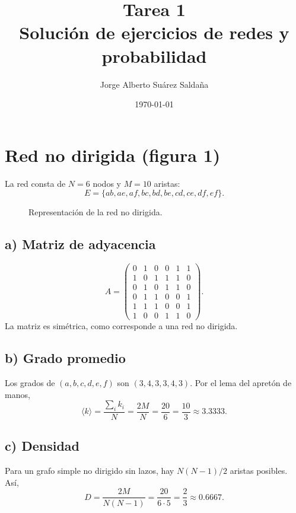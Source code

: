 \documentclass[12pt,a4paper]{article}
\title{Tarea 1\\\large Solución de ejercicios de redes y probabilidad}
\author{Jorge Alberto Suárez Saldaña}
\date{\today}
\begin{document}
\maketitle

\section{Red no dirigida (figura 1)}
La red consta de $N=6$ nodos y $M=10$ aristas:
\[
E=\{ab,ae,af,bc,bd,be,cd,ce,df,ef\}.
\]
\begin{figure}[H]\centering
{}
\caption{Representación de la red no dirigida.}
\end{figure}
\subsection*{a) Matriz de adyacencia}
\[
A=\begin{pmatrix}
0&1&0&0&1&1\\
1&0&1&1&1&0\\
0&1&0&1&1&0\\
0&1&1&0&0&1\\
1&1&1&0&0&1\\
1&0&0&1&1&0
\end{pmatrix}.
\]
La matriz es simétrica, como corresponde a una red no dirigida.
\subsection*{b) Grado promedio}
Los grados de $(a,b,c,d,e,f)$ son $(3,4,3,3,4,3)$. Por el lema del apretón de manos,
\[
\boxed{\langle k\rangle=\frac{\sum_i k_i}{N}=\frac{2M}{N}=\frac{20}{6}=\frac{10}{3}\approx3.3333.}
\]
\subsection*{c) Densidad}
Para un grafo simple no dirigido sin lazos, hay $N(N-1)/2$ aristas posibles. Así,
\[
\boxed{D=\frac{2M}{N(N-1)}=\frac{20}{6\cdot5}=\frac23\approx0.6667.}
\]
\end{document}
